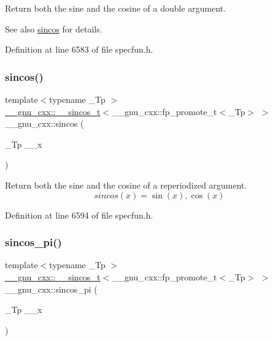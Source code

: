 Return both the sine and the cosine of a {\ttfamily double} argument.

\begin{DoxySeeAlso}{See also}
\hyperlink{group__mathsf__gnu_ga8041c24b528475bcf8a4178e484652a3}{sincos} for details. 
\end{DoxySeeAlso}


Definition at line 6583 of file specfun.\+h.

\mbox{\label{group__mathsf__gnu_ga5d3a375ada451e0a9a78441ddfcf52a3}} 
\subsubsection{\texorpdfstring{sincos()}{sincos()}\hspace{0.1cm}{\footnotesize\ttfamily [2/2]}}
{\footnotesize\ttfamily template$<$typename \+\_\+\+Tp $>$ \\
\hyperlink{struct____gnu__cxx_1_1____sincos__t}{\+\_\+\+\_\+gnu\+\_\+cxx\+::\+\_\+\+\_\+sincos\+\_\+t}$<$\+\_\+\+\_\+gnu\+\_\+cxx\+::fp\+\_\+promote\+\_\+t$<$\+\_\+\+Tp$>$ $>$ \+\_\+\+\_\+gnu\+\_\+cxx\+::sincos (\begin{DoxyParamCaption}\item[{\+\_\+\+Tp}]{\+\_\+\+\_\+x }\end{DoxyParamCaption})\hspace{0.3cm}{\ttfamily [inline]}}

Return both the sine and the cosine of a reperiodized argument. \[ sincos(x) = {\sin(x), \cos(x)} \] 

Definition at line 6594 of file specfun.\+h.

\mbox{\label{group__mathsf__gnu_ga6553883f127ea0de67041c3128e03813}} 
\subsubsection{\texorpdfstring{sincos\+\_\+pi()}{sincos\_pi()}}
{\footnotesize\ttfamily template$<$typename \+\_\+\+Tp $>$ \\
\hyperlink{struct____gnu__cxx_1_1____sincos__t}{\+\_\+\+\_\+gnu\+\_\+cxx\+::\+\_\+\+\_\+sincos\+\_\+t}$<$\+\_\+\+\_\+gnu\+\_\+cxx\+::fp\+\_\+promote\+\_\+t$<$\+\_\+\+Tp$>$ $>$ \+\_\+\+\_\+gnu\+\_\+cxx\+::sincos\+\_\+pi (\begin{DoxyParamCaption}\item[{\+\_\+\+Tp}]{\+\_\+\+\_\+x }\end{DoxyParamCaption})\hspace{0.3cm}{\ttfamily [inline]}}

